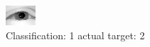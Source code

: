 \begin{figure}[h!]
\begin{center}
\includegraphics[width=0.60\columnwidth]{figures/ID2355_class_1_target_2.png}
\end{center}
\caption{ Classification: 1 actual target: 2}
\label{fig:ID2355_class_1_target_2}
\end{figure}
